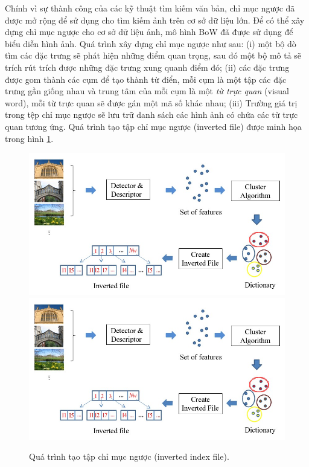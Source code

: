 Chính vì sự thành công của các kỹ thuật tìm kiếm văn bản, chỉ mục ngược đã được mở rộng để sử dụng cho tìm kiếm ảnh trên cơ sở dữ liệu lớn. Để có thể xây dựng chỉ mục ngược cho cơ sở dữ liệu ảnh, mô hình BoW đã được sử dụng để biểu diễn hình ảnh. Quá trình xây dựng chỉ mục ngược như sau: (i) một bộ dò tìm các đặc trưng sẽ phát hiện những điểm quan trọng, sau đó một bộ mô tả sẽ trích rút trích được những đặc trưng xung quanh điểm đó; (ii) các đặc trưng được gom thành các cụm để tạo thành từ điển, mỗi cụm là một tập các đặc trưng gần giống nhau và trung tâm của mỗi cụm là một \textit{từ trực quan} (visual word), mỗi từ trực quan sẽ được gán một mã số khác nhau; (iii) Trường giá trị trong tệp chỉ mục ngược sẽ lưu trữ danh sách các hình ảnh có chứa các từ trực quan tương ứng. Quá trình tạo tập chỉ mục ngược (inverted file) được minh họa trong hình \ref{FigInvertedFile}.

\begin{figure}[!htbp]
  \begin{center}
    \leavevmode
    \ifpdf
      \includegraphics[scale=0.51]{invertedFile}
    \else
      \includegraphics[scale=0.51]{invertedFile}
    \fi
    \caption[Quá trình tạo tập chỉ mục ngược]{Quá trình tạo tập chỉ mục ngược (inverted index file).}
    \label{FigInvertedFile}
  \end{center}
\end{figure}

